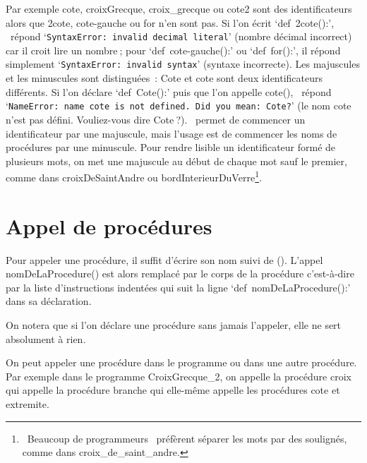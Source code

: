 Par exemple {\idt cote}, {\idt croixGrecque}, {\idt croix\_grecque} ou {\idt cote2} sont des 
identificateurs alors que {\idt 2cote}, {\idt cote-gauche} ou {\idt for} n'en sont pas. 
Si l'on écrit `{\mcl def}\ {\idt 2cote():}', \python\ répond 
`{\tt SyntaxError: invalid decimal literal}' (nombre décimal incorrect) car il croit 
lire un nombre$\:$; pour `{\mcl def}\ {\idt cote-gauche():}' ou `{\mcl def}\ {\idt for():}', il 
répond simplement `{\tt SyntaxError: invalid syntax}' (syntaxe incorrecte).
Les majuscules et les minuscules sont distinguées~: {\idt Cote} et {\idt cote} sont deux 
identificateurs différents. Si l'on déclare `{\mcl def}\ {\idt Cote():}' puis que l'on 
appelle {\idt cote()}, \python\ répond 
`{\tt NameError: name \textquotesingle{}cote\textquotesingle{} is not defined. Did you mean: \textquotesingle{}Cote\textquotesingle{}?}' 
(le nom {\idt cote} n'est pas défini. Vouliez-vous dire {\idt Cote}$\:$?).
\python\ permet de commencer un identificateur par une majuscule, mais l'usage est de 
commencer les noms de procédures par une minuscule. Pour rendre 
lisible un identificateur formé de plusieurs mots, on
met une majuscule au début de chaque mot sauf le premier, comme dans 
{\idt croixDeSaintAndre} ou {\idt bordInterieurDuVerre}\footnote{\ Beaucoup de programmeurs 
\python\ préfèrent séparer les mots par des soulignés, comme dans {\idt croix\_de\_saint\_andre}.}.

\section{Appel de procédures} 

Pour appeler une procédure, il suffit d'écrire son nom suivi 
de {\idt ()}. L'appel {\idt nomDeLaProcedure()}
est alors remplacé par le corps de la procédure c'est-à-dire par la liste
d'instructions indentées qui suit la ligne `{\mcl def}\ {\idt nomDeLaProcedure():}' dans sa déclaration.

On notera que si l'on déclare une procédure sans jamais l'appeler, elle 
ne sert absolument à rien. 

On peut appeler une procédure dans le programme ou dans une autre procédure.
Par exemple dans le programme {\idt CroixGrecque\_2}, on appelle 
la procédure {\idt croix} qui appelle la procédure {\idt branche} qui elle-même
appelle les procédures {\idt cote} et {\idt extremite}. 

